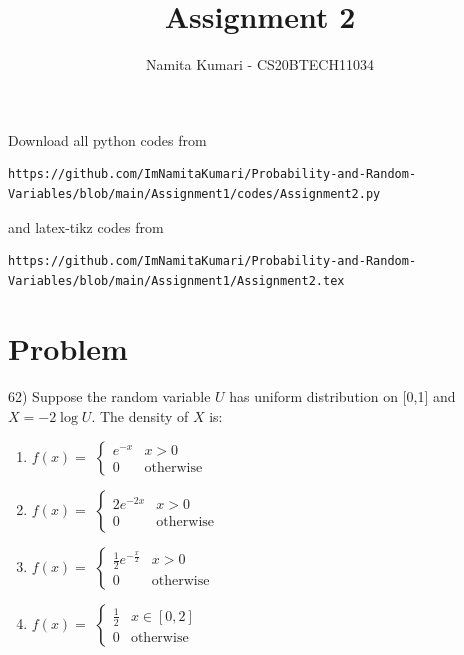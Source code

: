 \documentclass[journal,12pt,twocolumn]{IEEEtran}
\begin{document}
\makeatletter
{}
\makeatother
\let\StandardTheFigure\thefigure
\let\vec\mathbf
\renewcommand{\thefigure}{\theproblem}
\def\putbox#1#2#3{\makebox[0in][l]{\makebox[#1][l]{}\raisebox{\baselineskip}[0in][0in]{\raisebox{#2}[0in][0in]{#3}}}}
     \def\rightbox#1{\makebox[0in][r]{#1}}
     \def\centbox#1{\makebox[0in]{#1}}
     \def\topbox#1{\raisebox{-\baselineskip}[0in][0in]{#1}}
     \def\midbox#1{\raisebox{-0.5\baselineskip}[0in][0in]{#1}}
\vspace{3cm}
\title{Assignment 2}
\author{Namita Kumari - CS20BTECH11034}
\maketitle
\newpage
\bigskip
Download all python codes from 
\begin{lstlisting}
https://github.com/ImNamitaKumari/Probability-and-Random-Variables/blob/main/Assignment1/codes/Assignment2.py
\end{lstlisting}
%
and latex-tikz codes from 
%
\begin{lstlisting}
https://github.com/ImNamitaKumari/Probability-and-Random-Variables/blob/main/Assignment1/Assignment2.tex
\end{lstlisting}
\section{Problem}
62) Suppose the random variable $U$ has uniform distribution on [0,1] and $X=-2\log{U}$. The density of $X$ is:
\begin{enumerate}
\item $f(x)=$
$\begin{cases}
e^{-x} & x>0\\
0 & \mathrm{otherwise}
\end{cases}$

\item $f(x)=$
$\begin{cases}
2e^{-2x} & x>0\\
0 & \mathrm{otherwise}
\end{cases}$

\item $f(x)=$
$\begin{cases}
\frac{1}{2}e^{-\frac{x}{2}} & x>0\\
0 & \mathrm{otherwise}
\end{cases}$

\item $f(x)=$
$\begin{cases}
\frac{1}{2} & x\in [0,2]\\
0 & \mathrm{otherwise}
\end{cases}$
\end{enumerate}
\end{document}
